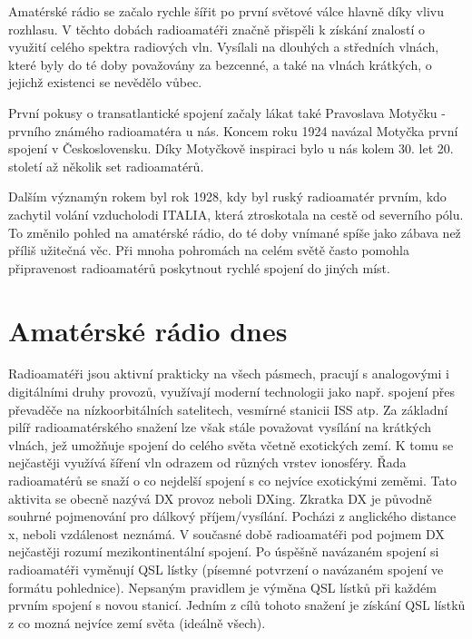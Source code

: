 Amatérské rádio se začalo rychle šířit po první světové válce hlavně díky vlivu
rozhlasu. %
V těchto dobách radioamatéři značně
přispěli k získání znalostí o využití celého spektra radiových vln. Vysílali na dlouhých a středních vlnách, které byly do té doby
považovány za bezcenné, a také na vlnách krátkých, o jejichž existenci se nevědělo vůbec.


První pokusy o transatlantické spojení začaly lákat také Pravoslava Motyčku - prvního známého radioamatéra u nás.
Koncem roku 1924 navázal Motyčka první spojení v Československu. 
Díky Motyčkově inspiraci bylo u nás kolem 30. let 20. století až několik set radioamatérů.

Dalším významýn rokem byl rok 1928, kdy byl ruský radioamatér prvním, kdo zachytil volání vzducholodi ITALIA,
která ztroskotala na cestě od severního pólu. To změnilo pohled na amatérské rádio, do té doby vnímané spíše jako zábava než
příliš užitečná věc. Při mnoha pohromách na celém světě často pomohla připravenost radioamatérů poskytnout rychlé spojení do
jiných míst.

\section{Amatérské rádio dnes}
\label{radioamateri_dnes}

Radioamatéři jsou aktivní prakticky na všech pásmech, pracují s analogovými i
digitálními druhy provozů, využívají moderní technologii jako např. spojení přes
převaděče na nízkoorbitálních satelitech, vesmírné stanicii ISS atp. 
Za základní pilíř radioamatérského snažení lze však stále považovat vysílání na
krátkých vlnách, jež umožňuje spojení do celého světa včetně exotických zemí. K
tomu se nejčastěji využívá šíření vln odrazem od různých vrstev ionosféry.
Řada radioamatérů se snaží o co nejdelší spojení s co nejvíce exotickými zeměmi.
Tato aktivita se obecně nazývá DX provoz neboli DXing. Zkratka DX je původně souhrné pojmenování
pro dálkový příjem/vysílání. Pocházi z anglického \clq distance
x\crq, neboli vzdálenost neznámá. V současné době radioamatéři pod pojmem DX
nejčastěji rozumí mezikontinentální spojení.
Po úspěšně navázaném spojení si radioamatéři vyměnují QSL lístky (písemné potvrzení o
navázaném spojení ve formátu pohlednice). Nepsaným pravidlem je výměna QSL
lístků při každém prvním spojení s novou stanicí. Jedním z cílů tohoto snažení je
získání QSL lístků z co mozná nejvíce zemí světa (ideálně všech).

